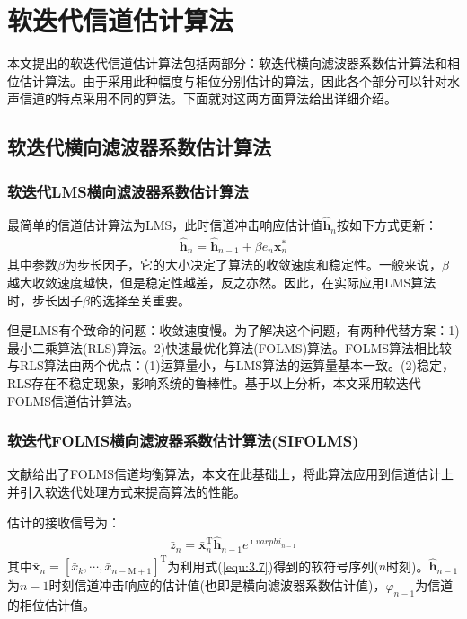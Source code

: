 \section{软迭代信道估计算法}
本文提出的软迭代信道估计算法包括两部分：软迭代横向滤波器系数估计算法和相位估计算法。由于采用此种幅度与相位分别估计的算法，因此各个部分可以针对水声信道的特点采用不同的算法。下面就对这两方面算法给出详细介绍。
\subsection{软迭代横向滤波器系数估计算法}
\subsubsection*{软迭代LMS横向滤波器系数估计算法}
最简单的信道估计算法为LMS，此时信道冲击响应估计值$\hat{\mathbf{h}}_n$按如下方式更新：
\begin{eqnarray}
    \hat{\mathbf{h}}_n=\hat{\mathbf{h}}_{n-1}+\beta e_n\mathbf{x}_n^*
    \label{equ:4.6}
\end{eqnarray}
其中参数$\beta$为步长因子，它的大小决定了算法的收敛速度和稳定性。一般来说，$\beta$越大收敛速度越快，但是稳定性越差，反之亦然。因此，在实际应用LMS算法时，步长因子$\beta$的选择至关重要。

但是LMS有个致命的问题：收敛速度慢。为了解决这个问题，有两种代替方案：1)最小二乘算法(RLS)算法。2)快速最优化算法(FOLMS)\citep{Geller1996}算法。FOLMS算法相比较与RLS算法由两个优点：(1)运算量小，与LMS算法的运算量基本一致。(2)稳定，RLS存在不稳定现象，影响系统的鲁棒性。基于以上分析，本文采用软迭代FOLMS信道估计算法。
\subsubsection*{软迭代FOLMS横向滤波器系数估计算法(SIFOLMS)}
文献给出了FOLMS信道均衡算法，本文在此基础上，将此算法应用到信道估计上并引入软迭代处理方式来提高算法的性能。

估计的接收信号为：
\begin{eqnarray}
    \bar{z}_n=\bar{\mathbf{x}}_n^{\mathrm{T}}\hat{\mathbf{h}}_{n-1}e^{\imath\hat{varphi}_{n-1}}
    \label{equ:4.7}
\end{eqnarray}
其中$\bar{\mathbf{x}}_n=[\bar{x}_k,\cdots,\bar{x}_{n-\mathrm{M}+1}]^{\mathrm{T}}$为利用式(\ref{equ:3.7})得到的软符号序列($n$时刻)。$\hat{\mathbf{h}}_{n-1}$为$n-1$时刻信道冲击响应的估计值(也即是横向滤波器系数估计值)，$\hat{\varphi}_{n-1}$为信道的相位估计值。

